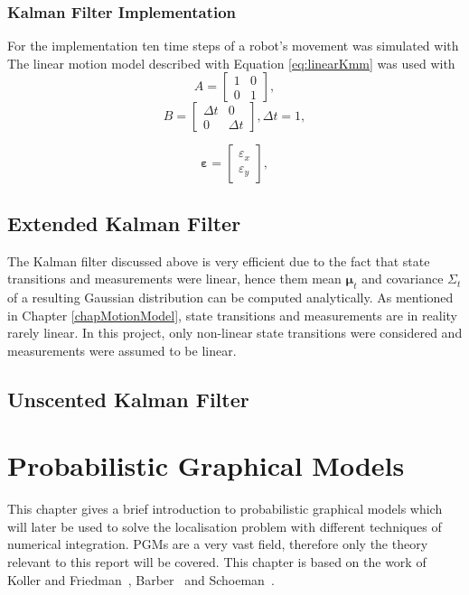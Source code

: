 \documentclass[12pt,oneside,openany,a4paper, %
afrikaans,english,
]{memoir}
\numberwithin{equation}{chapter}
\begin{document}
\subsection{Kalman Filter Implementation}
For the implementation ten time steps of a robot's movement was simulated with 
The linear motion model described with Equation \ref{eq:linearKmm} was used with
\begin{equation}
A =
\begin{bmatrix}
1 & 0\\
0 & 1
\end{bmatrix},
\end{equation}
\begin{equation}
B = \begin{bmatrix}
\Delta t & 0\\
0 & \Delta t
\end{bmatrix}, \Delta t = 1,
\end{equation}

\begin{equation}
\bm{\varepsilon} =
\begin{bmatrix}
\varepsilon_x\\
\varepsilon_y
\end{bmatrix},
\end{equation}

\section{Extended Kalman Filter}
The Kalman filter discussed above is very efficient due to the fact that state transitions and measurements were linear, hence them mean $\bm{\mu}_t$ and covariance $\Sigma_t$ of a resulting Gaussian distribution can be computed analytically.
As mentioned in Chapter \ref{chapMotionModel}, state transitions and measurements are in reality rarely linear. In this project, only non-linear state transitions were considered and measurements were assumed to be linear.
\section{Unscented Kalman Filter}
\chapter{Probabilistic Graphical Models}
This chapter gives a brief introduction to probabilistic graphical models which will later be used to solve the localisation problem with different techniques of numerical integration. PGMs are a very vast field, therefore only the theory relevant to this report will be covered. This chapter is based on the work of Koller and Friedman~\cite{koller}, Barber~\cite{barber} and Schoeman~\citep{JC}.
\end{document}
